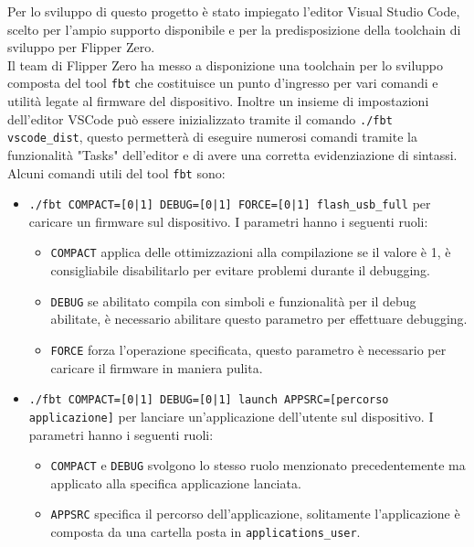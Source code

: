 Per lo sviluppo di questo progetto è stato impiegato l'editor Visual Studio Code, scelto per l'ampio supporto disponibile e per la predisposizione della toolchain di sviluppo per Flipper Zero.\\
Il team di Flipper Zero ha messo a disponizione una toolchain per lo sviluppo composta del tool \texttt{fbt} \cite{fbt} che costituisce un punto d'ingresso per vari comandi e utilità legate al firmware del dispositivo. Inoltre un insieme di impostazioni dell'editor VSCode può essere inizializzato tramite il comando \texttt{./fbt vscode\_dist}, questo permetterà di eseguire numerosi comandi tramite la funzionalità "Tasks" dell'editor e di avere una corretta evidenziazione di sintassi.\\
Alcuni comandi utili del tool \texttt{fbt} sono:
\begin{itemize}
  \item \texttt{./fbt COMPACT=[0|1] DEBUG=[0|1] FORCE=[0|1] flash\_usb\_full} per caricare un firmware sul dispositivo. I parametri hanno i seguenti ruoli:
  \begin{itemize}
    \item \texttt{COMPACT} applica delle ottimizzazioni alla compilazione se il valore è 1, è consigliabile disabilitarlo per evitare problemi durante il debugging.
    \item \texttt{DEBUG} se abilitato compila con simboli e funzionalità per il debug abilitate, è necessario abilitare questo parametro per effettuare debugging.
    \item \texttt{FORCE} forza l'operazione specificata, questo parametro è necessario per caricare il firmware in maniera pulita.
  \end{itemize}
  \item \texttt{./fbt COMPACT=[0|1] DEBUG=[0|1] launch APPSRC=[percorso applicazione]} per lanciare un'applicazione dell'utente sul dispositivo. I parametri hanno i seguenti ruoli:
  \begin{itemize}
    \item \texttt{COMPACT} e \texttt{DEBUG} svolgono lo stesso ruolo menzionato precedentemente ma applicato alla specifica applicazione lanciata.
    \item \texttt{APPSRC} specifica il percorso dell'applicazione, solitamente l'applicazione è composta da una cartella posta in \texttt{applications\_user}.
  \end{itemize}
\end{itemize}

